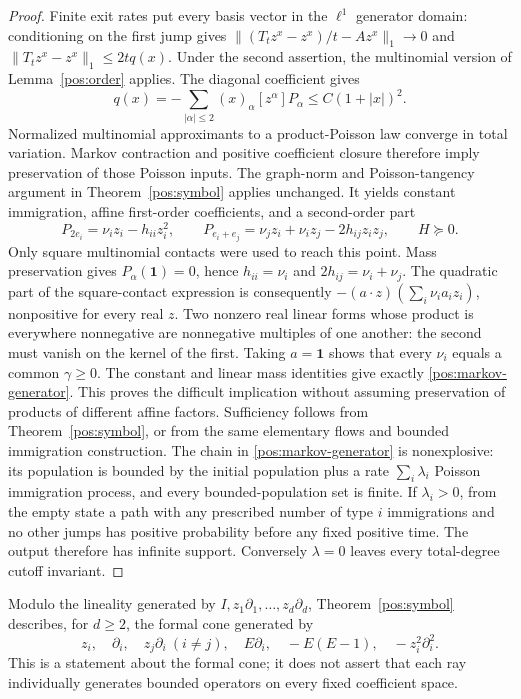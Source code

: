 \documentclass[reqno]{amsart}
\theoremstyle{definition}
\theoremstyle{remark}
\begin{document}
\begin{proof}
Finite exit rates put every basis vector in the \(\ell^1\) generator domain:
conditioning on the first jump gives
\(\|(T_tz^x-z^x)/t-Az^x\|_1\to0\) and
\(\|T_tz^x-z^x\|_1\le2tq(x)\).
Under the second assertion, the multinomial version of Lemma~\ref{pos:order}
applies.  The diagonal coefficient gives
\[
 q(x)=-\sum_{|\alpha|\le2}(x)_\alpha[z^\alpha]P_\alpha
 \le C(1+|x|)^2.
\]
Normalized multinomial approximants to a product-Poisson law converge in total
variation.  Markov contraction and positive coefficient closure therefore imply
preservation of those Poisson inputs.  The graph-norm and Poisson-tangency argument
in Theorem~\ref{pos:symbol} applies unchanged.  It yields constant immigration,
affine first-order coefficients, and a second-order part
\[
 P_{2e_i}=\nu_i z_i-h_{ii}z_i^2,\qquad
 P_{e_i+e_j}=\nu_jz_i+\nu_i z_j-2h_{ij}z_i z_j,
 \qquad H\succeq0.
\]
Only square multinomial contacts were used to reach this point.
Mass preservation gives \(P_\alpha(\boldsymbol1)=0\), hence
\(h_{ii}=\nu_i\) and \(2h_{ij}=\nu_i+\nu_j\).
The quadratic part of the square-contact expression is consequently
\(-(a\cdot z)(\sum_i\nu_i a_i z_i)\), nonpositive for every real \(z\).
Two nonzero real linear forms whose product is everywhere nonnegative are
nonnegative multiples of one another: the second must vanish on the kernel
of the first.  Taking \(a=\boldsymbol1\) shows that every \(\nu_i\) equals a
common \(\gamma\ge0\).  The constant and linear mass identities give exactly
\eqref{pos:markov-generator}.  This proves the difficult implication without
assuming preservation of products of different affine factors.
Sufficiency follows from Theorem~\ref{pos:symbol}, or from the same elementary
flows and bounded immigration construction.  The chain in
\eqref{pos:markov-generator} is nonexplosive: its population is bounded by the
initial population plus a rate \(\sum_i\lambda_i\) Poisson immigration process,
and every bounded-population set is finite.
If \(\lambda_i>0\), from the empty state a path with any prescribed number of
type \(i\) immigrations and no other jumps has positive probability before any
fixed positive time.  The output therefore has infinite support.  Conversely
\(\lambda=0\) leaves every total-degree cutoff invariant.
\end{proof}

Modulo the lineality generated by \(I,z_1\partial_1,\ldots,z_d\partial_d\),
Theorem~\ref{pos:symbol} describes, for \(d\ge2\), the formal cone generated by
\[
 z_i,\quad\partial_i,\quad z_j\partial_i\ (i\ne j),\quad
 E\partial_i,\quad-E(E-1),\quad-z_i^2\partial_i^2.
\]
This is a statement about the formal cone; it does not assert that each ray
individually generates bounded operators on every fixed coefficient space.
\end{document}
